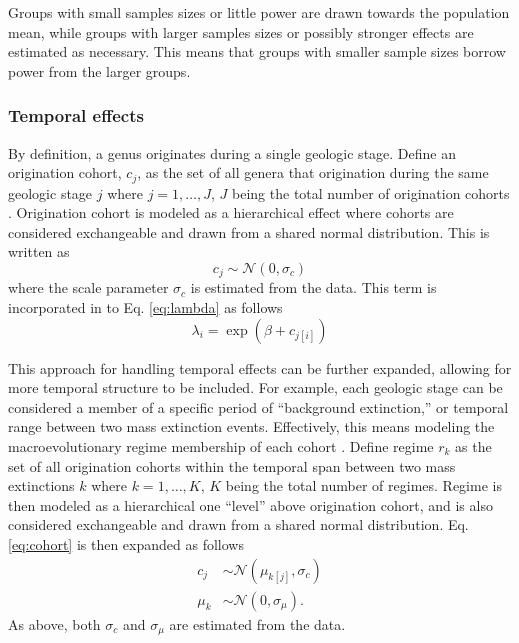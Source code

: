 \documentclass[12pt,letterpaper]{article}
\begin{document}
Groups with small samples sizes or little power are drawn towards the population mean, while groups with larger samples sizes or possibly stronger effects are estimated as necessary. This means that groups with smaller sample sizes borrow power from the larger groups.


\subsubsection{Temporal effects}

By definition, a genus originates during a single geologic stage. Define an origination cohort, \(c_{j}\), as the set of all genera that origination during the same geologic stage \(j\) where \(j = 1, \dots, J\), \(J\) being the total number of origination cohorts \citep{Raup1978}. Origination cohort is modeled as a hierarchical effect where cohorts are considered exchangeable and drawn from a shared normal distribution. This is written as 
\begin{equation}
  c_{j} \sim \mathcal{N}(0, \sigma_{c})
  \label{eq:cohort}
\end{equation}
where the scale parameter \(\sigma_{c}\) is estimated from the data. This term is incorporated in to Eq. \ref{eq:lambda} as follows
\begin{equation}
  \lambda_{i} = \exp(\beta + c_{j[i]})
  \label{eq:lambda_cohort}
\end{equation}

This approach for handling temporal effects can be further expanded, allowing for more temporal structure to be included. For example, each geologic stage can be considered a member of a specific period of ``background extinction,'' or temporal range between two mass extinction events. Effectively, this means modeling the macroevolutionary regime membership of each cohort \citep{Jablonski1987}. Define regime \(r_{k}\) as the set of all origination cohorts within the temporal span between two mass extinctions \(k\) where \(k = 1, \dots, K\), \(K\) being the total number of regimes. Regime is then modeled as a hierarchical one ``level'' above origination cohort, and is also considered exchangeable and drawn from a shared normal distribution. Eq. \ref{eq:cohort} is then expanded as follows
\begin{equation}
  \begin{aligned}
    c_{j} &\sim \mathcal{N}(\mu_{k[j]}, \sigma_{c}) \\
    \mu_{k} &\sim \mathcal{N}(0, \sigma_{\mu}).
  \end{aligned}
  \label{eq:cohort_regime}
\end{equation}
As above, both \(\sigma_{c}\) and \(\sigma_{\mu}\) are estimated from the data.
\end{document}
